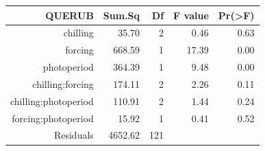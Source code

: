 \documentclass{article}\usepackage[]{graphicx}\usepackage[]{color}
\begin{document}
\begin{table}[ht]
\centering
\begin{tabular}{rrrrr}
  \hline
  QUERUB & Sum.Sq & Df & F value & Pr(>F) \\
 \hline
chilling & 35.70 &   2 & 0.46 & 0.63 \\ 
  forcing & 668.59 &   1 & 17.39 & 0.00 \\ 
  photoperiod & 364.39 &   1 & 9.48 & 0.00 \\ 
  chilling:forcing & 174.11 &   2 & 2.26 & 0.11 \\ 
  chilling:photoperiod & 110.91 &   2 & 1.44 & 0.24 \\ 
  forcing:photoperiod & 15.92 &   1 & 0.41 & 0.52 \\ 
  Residuals & 4652.62 & 121 &  &  \\ 
   \hline
\end{tabular}
\end{table}
\end{document}

